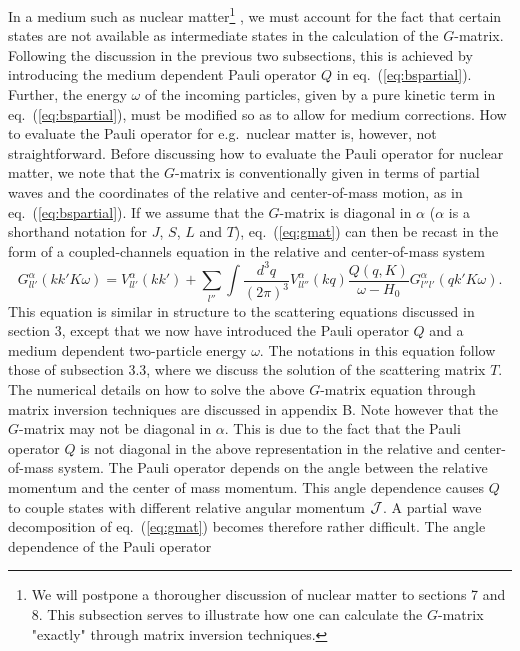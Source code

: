 In
a medium such as nuclear 
matter\footnote{We will postpone a thorougher discussion of
nuclear matter to sections 7 and 8. This subsection serves to
illustrate how one can calculate the $G$-matrix
"exactly" through matrix inversion techniques.} ,
we must account
for the fact that certain states are not available as intermediate
states in the calculation of the $G$-matrix.
Following the discussion
in the previous two subsections,
this is achieved by introducing the medium
dependent Pauli operator $Q$ in
eq.\ (\ref{eq:bspartial}). Further, the
energy $\omega$ of the incoming particles, given by a pure kinetic
term in eq.\ (\ref{eq:bspartial}), must be modified so as to allow
for medium corrections.
How to evaluate the Pauli operator for
e.g.\ nuclear matter is, however, not straightforward.
Before discussing how to evaluate the Pauli operator for nuclear matter,
we note that the $G$-matrix
is conventionally given in terms of partial waves and
the coordinates of the relative and center-of-mass motion, as
in eq.\ (\ref{eq:bspartial}).
If we assume that the $G$-matrix is diagonal in $\alpha$ ($\alpha$ is a shorthand
notation for $J$, $S$, $L$ and $T$),
eq.\ (\ref{eq:gmat}) can then be recast in the form of a
coupled-channels equation in the relative and center-of-mass system
\cite{ht70}
\begin{equation}
   G_{ll'}^{\alpha}(kk'K\omega )=V_{ll'}^{\alpha}(kk')
   +\sum_{l''}\int \frac{d^3 q}{(2\pi )^3}V_{ll''}^{\alpha}(kq)
   \frac{Q(q,K)}{\omega -H_0}
   G_{l''l'}^{\alpha}(qk'K\omega).
   \label{eq:gnonrel}
\end{equation}
This equation is similar in structure to the scattering
equations discussed in section 3, except that we now have
introduced the Pauli operator $Q$ and a medium dependent two-particle
energy $\omega$. The notations in this equation follow those of
subsection 3.3, where we discuss the solution of the scattering
matrix $T$.
The numerical details on how to solve the above $G$-matrix
equation through matrix inversion techniques are discussed in appendix B.
Note however that the $G$-matrix may not be diagonal in $\alpha$.
This is due to the fact that the
Pauli operator $Q$ is not diagonal
in the above representation in the relative and center-of-mass
system. The Pauli operator depends on the
angle between the relative momentum and the center of mass momentum.
This angle dependence causes $Q$ to couple states with different
relative angular
momentum ${\cal J}$. A partial wave decomposition of eq.\ (\ref{eq:gmat})
becomes therefore rather difficult.
The angle dependence of the Pauli operator
